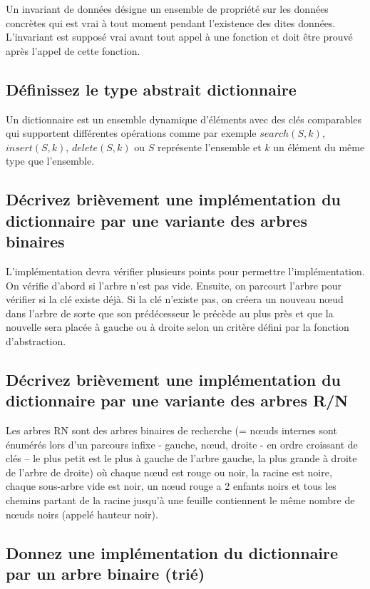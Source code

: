 \documentclass[11pt]{article}
\begin{document}
Un invariant de données désigne un ensemble de propriété sur les données concrètes qui est vrai à tout moment pendant l'existence des dites données. L'invariant est supposé vrai avant tout appel à une fonction et doit être prouvé après l'appel de cette fonction.

\subsection{Définissez le type abstrait dictionnaire}

Un dictionnaire est un ensemble dynamique d'éléments avec des clés comparables qui supportent différentes opérations comme par exemple $search(S, k)$, $insert(S, k)$, $delete(S, k)$ ou $S$ représente l'ensemble et $k$ un élément du même type que l'ensemble.

\subsection{Décrivez brièvement une implémentation du dictionnaire par une variante des arbres binaires}

L’implémentation devra vérifier plusieurs points pour permettre l’implémentation. On vérifie d’abord si l’arbre n’est pas vide. Ensuite, on parcourt l’arbre pour vérifier si la clé existe déjà. Si la clé n’existe pas, on créera un nouveau nœud dans l’arbre de sorte que son prédécesseur le précède au plus près et que la nouvelle sera placée à gauche ou à droite selon un critère défini par la fonction d’abstraction.

\subsection{Décrivez brièvement une implémentation du dictionnaire par une variante des arbres R/N}

Les arbres RN sont des arbres binaires de recherche (= nœuds internes sont énumérés lors d’un parcours infixe - gauche, nœud, droite - en ordre croissant de clés – le plus petit est le plus à gauche de l’arbre gauche, la plus grande à droite de l’arbre de droite) où chaque nœud est rouge ou noir, la racine est noire, chaque sous-arbre vide est noir, un nœud rouge a 2 enfants noirs et tous les chemins partant de la racine jusqu’à une feuille contiennent le même nombre de nœuds noirs (appelé hauteur noir).

\subsection{Donnez une implémentation du dictionnaire par un arbre binaire (trié)}
\end{document}
